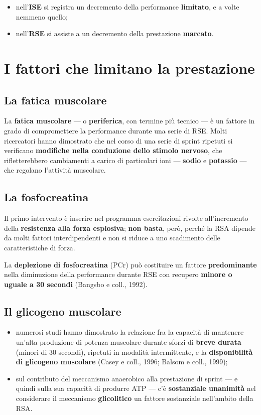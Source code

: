 \begin{itemize}
  \item nell'\textbf{ISE} si registra un decremento della performance \textbf{limitato}, e a volte
    nemmeno quello;
  \item nell'\textbf{RSE} si assiste a un decremento della prestazione \textbf{marcato}.
\end{itemize}

\section{I fattori che limitano la prestazione}

\subsection{La fatica muscolare}

La \textbf{fatica muscolare} --- o \textbf{periferica}, con termine più tecnico --- è un fattore in
grado di compromettere la performance durante una serie di RSE. Molti ricercatori hanno dimostrato
che nel corso di una serie di sprint ripetuti si verificano \textbf{modifiche nella conduzione dello
stimolo nervoso}, che rifletterebbero cambiamenti a carico di particolari ioni --- \textbf{sodio} e
\textbf{potassio} --- che regolano l'attività muscolare.

\subsection{La fosfocreatina}

Il primo intervento è inserire nel programma esercitazioni rivolte all'incremento della
\textbf{resistenza alla forza esplosiva}; \textbf{non basta}, però, perché la RSA dipende da molti
fattori interdipendenti e non si riduce a uno scadimento delle caratteristiche di forza.

La \textbf{deplezione di fosfocreatina} (PCr) può costituire un fattore \textbf{predominante} nella
diminuzione della performance durante RSE con recupero \textbf{minore o uguale a 30 secondi}
(Bangsbo e coll., 1992).

\subsection{Il glicogeno muscolare}

\begin{itemize}
  \item numerosi studi hanno dimostrato la relazione fra la capacità di mantenere un'alta produzione
    di potenza muscolare durante sforzi di \textbf{breve durata} (minori di 30 secondi), ripetuti in
    modalità intermittente, e la \textbf{disponibilità di glicogeno muscolare} (Casey e coll., 1996;
    Balsom e coll., 1999);
  \item sul contributo del meccanismo anaerobico alla prestazione di sprint --- e quindi sulla sua
    capacità di produrre ATP --- c'è \textbf{sostanziale unanimità} nel considerare il meccanismo
    \textbf{glicolitico} un fattore sostanziale nell'ambito della RSA.
\end{itemize}

